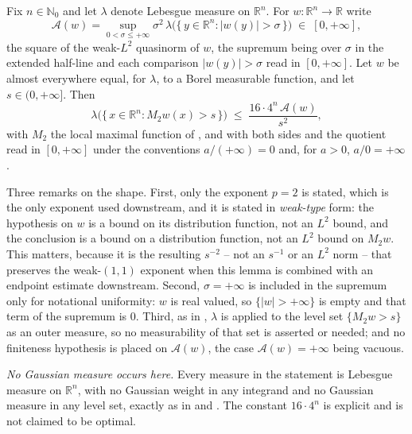 \begin{lemma}
Fix $n \in \mathbb{N}_0$ and let $\lambda$ denote Lebesgue measure on
$\mathbb{R}^n$.  For $w : \mathbb{R}^n \to \mathbb{R}$ write
\[
  \mathcal A(w)
    = \sup_{0 < \sigma \leq +\infty}
        \sigma^2\,\lambda\bigl(\{\,y \in \mathbb{R}^n : |w(y)| > \sigma\,\}\bigr)
  \;\in\; [0,+\infty] ,
\]
the square of the weak-$L^2$ quasinorm of $w$, the supremum being over
$\sigma$ in the extended half-line and each comparison $|w(y)| > \sigma$ read in
$[0,+\infty]$.  Let $w$ be almost everywhere equal, for $\lambda$, to a Borel
measurable function, and let $s \in (0,+\infty]$.  Then
\[
  \lambda\bigl(\{\,x \in \mathbb{R}^n : M_2w(x) > s\,\}\bigr)
    \;\leq\; \frac{16\cdot4^n\,\mathcal A(w)}{s^2} ,
\]
with $M_2$ the local maximal function of , and
with both sides and the quotient read in $[0,+\infty]$ under the conventions
$a/(+\infty) = 0$ and, for $a > 0$, $a/0 = +\infty$.

Three remarks on the shape.  First, only the exponent $p = 2$ is stated, which
is the only exponent used downstream, and it is stated in \emph{weak-type}
form: the hypothesis on $w$ is a bound on its distribution function, not an
$L^2$ bound, and the conclusion is a bound on a distribution function, not an
$L^2$ bound on $M_2w$.  This matters, because it is the resulting $s^{-2}$ --
not an $s^{-1}$ or an $L^2$ norm -- that preserves the weak-$(1,1)$ exponent
when this lemma is combined with an endpoint estimate downstream.  Second,
$\sigma = +\infty$ is included in the supremum only for notational uniformity:
$w$ is real valued, so $\{|w| > +\infty\}$ is empty and that term of the
supremum is $0$.  Third, as in , $\lambda$ is
applied to the level set $\{M_2w > s\}$ as an outer measure, so no measurability
of that set is asserted or needed; and no finiteness hypothesis is placed on
$\mathcal A(w)$, the case $\mathcal A(w) = +\infty$ being vacuous.

\emph{No Gaussian measure occurs here.}  Every measure in the statement is
Lebesgue measure on $\mathbb{R}^n$, with no Gaussian weight in any integrand and
no Gaussian measure in any level set, exactly as in
 and .  The
constant $16\cdot4^n$ is explicit and is not claimed to be optimal.
\end{lemma}
